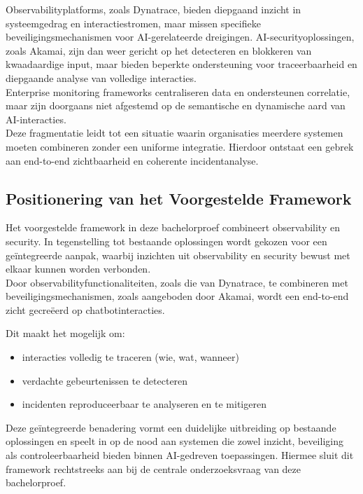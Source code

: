 Observabilityplatforms, zoals Dynatrace, bieden diepgaand inzicht in systeemgedrag en interactiestromen, maar missen specifieke beveiligingsmechanismen voor AI-gerelateerde dreigingen. AI-securityoplossingen, zoals Akamai, zijn dan weer gericht op het detecteren en blokkeren van kwaadaardige input, maar bieden beperkte ondersteuning voor traceerbaarheid en diepgaande analyse van volledige interacties.\\

Enterprise monitoring frameworks centraliseren data en ondersteunen correlatie, maar zijn doorgaans niet afgestemd op de semantische en dynamische aard van AI-interacties.\\

Deze fragmentatie leidt tot een situatie waarin organisaties meerdere systemen moeten combineren zonder een uniforme integratie. Hierdoor ontstaat een gebrek aan end-to-end zichtbaarheid en coherente incidentanalyse.

\subsection{Positionering van het Voorgestelde Framework}

Het voorgestelde framework in deze bachelorproef combineert observability en security. In tegenstelling tot bestaande oplossingen wordt gekozen voor een geïntegreerde aanpak, waarbij inzichten uit observability en security bewust met elkaar kunnen worden verbonden.\\

Door observabilityfunctionaliteiten, zoals die van Dynatrace, te combineren met beveiligingsmechanismen, zoals aangeboden door Akamai, wordt een end-to-end zicht gecreëerd op chatbotinteracties.

Dit maakt het mogelijk om:

\begin{itemize}
    \item interacties volledig te traceren (wie, wat, wanneer)
    \item verdachte gebeurtenissen te detecteren
    \item incidenten reproduceerbaar te analyseren en te mitigeren
\end{itemize}

Deze geïntegreerde benadering vormt een duidelijke uitbreiding op bestaande oplossingen en speelt in op de nood aan systemen die zowel inzicht, beveiliging als controleerbaarheid bieden binnen AI-gedreven toepassingen. Hiermee sluit dit framework rechtstreeks aan bij de centrale onderzoeksvraag van deze bachelorproef.